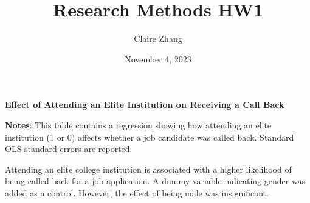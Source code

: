 \documentclass[11]{article}
\title{Research Methods HW1}
\author{Claire Zhang}
\date{November 4, 2023}
\begin{document}
\maketitle

\begin{table}[htbp]
\caption{\textbf{Effect of Attending an Elite Institution on Receiving a Call Back}
\label{tab:EngApproach}}
\center
	
    \center
    \begin{footnotesize}
    \textbf{Notes}: This table contains a regression showing how attending an elite institution (1 or 0) affects whether a job candidate was called back. Standard OLS standard errors are reported.  
    \end{footnotesize}
\end{table}

Attending an elite college institution is associated with a higher likelihood of being called back for a job application. A dummy variable indicating gender was added as a control. However, the effect of being male was insignificant.
\end{document}
